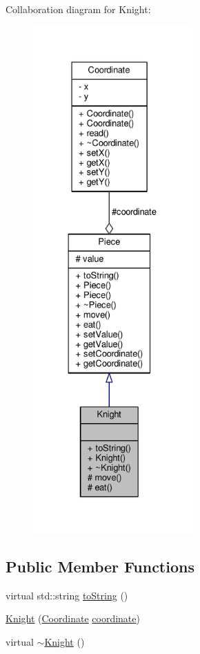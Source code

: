 Collaboration diagram for Knight\+:
\nopagebreak
\begin{figure}[H]
\begin{center}
\leavevmode
\includegraphics[height=550pt]{class_knight__coll__graph}
\end{center}
\end{figure}
\subsection*{Public Member Functions}
\begin{DoxyCompactItemize}
\item 
virtual std\+::string \hyperlink{class_knight_a3ecdeb255fa07eaa22d0cc948520c181}{to\+String} ()
\item 
\hyperlink{class_knight_ada9451f9c4ae0b30e7c0f0eaa7c78aac}{Knight} (\hyperlink{class_coordinate}{Coordinate} \hyperlink{class_piece_a9e92373c8fffc1f5efb20d62204b70cf}{coordinate})
\item 
virtual \hyperlink{class_knight_a2754123d6876babe915f4da8f761361b}{$\sim$\+Knight} ()
\end{DoxyCompactItemize}
